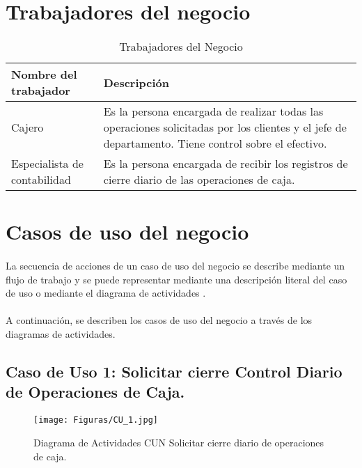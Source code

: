 \section{Trabajadores del negocio}
\begin{table}[ht]
	\begin{supertabular}{ |l|p{12cm}| }
		\hline
		\textbf{Nombre del trabajador}
		& \textbf{Descripción} \\ \hline
		
		Cajero
		& Es la persona encargada de realizar todas las operaciones solicitadas por los clientes y el jefe de departamento. Tiene control sobre el efectivo. \\ \hline
		
		Especialista de contabilidad
		& Es la persona encargada de recibir los registros de cierre diario de las operaciones de caja. \\
		
		\hline
	\end{supertabular}
	\caption[Trabajadores del Negocio]{Trabajadores del Negocio}
	\label{table:trb_neg}
\end{table}

\section{Casos de uso del negocio}
\paragraph{}La secuencia de acciones de un caso de uso del negocio se describe mediante un flujo de trabajo y se puede representar mediante una descripción literal del caso de uso o mediante el diagrama de actividades \cite{miranda_aplicaciones_2018}.
\paragraph{}A continuación, se describen los casos de uso del negocio a través de los diagramas de actividades.

\subsection{Caso de Uso 1: Solicitar cierre Control Diario de Operaciones de Caja.}
\begin{figure}[H] %
	\centering
	\texttt{[image: Figuras/CU\_1.jpg]}
	\caption{Diagrama de Actividades CUN Solicitar cierre diario de operaciones de caja.}
	\label{fig:CU_1}
\end{figure}

